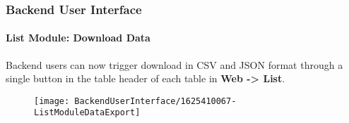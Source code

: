 %

\begin{frame}[fragile]
	\frametitle{Backend User Interface}
	\framesubtitle{List Module: Download Data}

	Backend users can now trigger download in CSV and JSON format through a
	single button in the table header of each table in \textbf{Web -> List}.

	\begin{figure}
		\texttt{[image: BackendUserInterface/1625410067-ListModuleDataExport]}
	\end{figure}

\end{frame}

